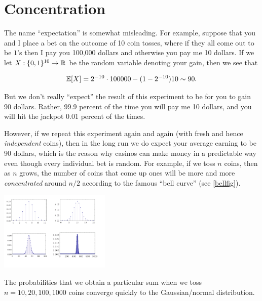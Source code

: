 
\section{Concentration}\label{Concentration}

The name ``expectation'' is somewhat misleading. For example, suppose
that you and I place a bet on the outcome of 10 coin tosses, where if
they all come out to be \(1\)'s then I pay you 100,000 dollars and
otherwise you pay me 10 dollars. If we let
\(X:\{0,1\}^{10} \rightarrow {\mathbb{R}}\) be the random variable denoting your
gain, then we see that

\[
\operatorname*{\mathbb E}[X] = 2^{-10}\cdot 100000 - (1-2^{-10})10 \sim 90 .
\]

But we don't really ``expect'' the result of this experiment to be for
you to gain 90 dollars. Rather, 99.9 percent of the time you will pay me
10 dollars, and you will hit the jackpot 0.01 percent of the times.

However, if we repeat this experiment again and again (with fresh and
hence \emph{independent} coins), then in the long run we do expect your
average earning to be 90 dollars, which is the reason why casinos can
make money in a predictable way even though every individual bet is
random. For example, if we toss \(n\) coins, then as \(n\) grows, the
number of coins that come up ones will be more and more
\emph{concentrated} around \(n/2\) according to the famous ``bell
curve'' (see \cref{bellfig}).


\begin{marginfigure}
\centering
\includegraphics[width=\linewidth, height=1.5in, keepaspectratio]{../figure/binomial.png}
\caption{The probabilities that we obtain a particular sum when we toss
\(n=10,20,100,1000\) coins converge quickly to the Gaussian/normal
distribution.}
\label{bellfig}
\end{marginfigure}

